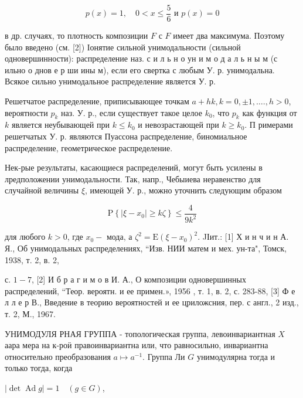 \documentclass[10pt]{article}
\begin{document}
\[

p(x)=1, \quad 0<x \leqslant \frac{5}{6} \text { и } p(x)=0

\]



в др. случаях, то плотность композиции $F$ с $F$ имеет два максимума. Поэтому было введено (см. [2]) Іонятие сильной унимодальности (сильной одновершинности): распределение наз. с и л ь н о ун и м о д а л ь н ы м (с ильно о днов е р ши ины м), если его свертка с любым У. р. унимодальна. Всякое сильно унимодальное распределение является У. р.



Решетчатое распределение, приписывающее точкам $a+h k, k=0, \pm 1, \ldots ., h>0$, вероятности $p_{k}$ наз. У. р., если существует такое целое $k_{0}$, что $p_{k}$ как функция от $k$ является неубывающей при $k \leqslant k_{0}$ и невозрастающей при $k \geqslant k_{0}$. П римерами решетчатых У. р. являются Пуассона распределение, биномиальное распределение, геометрическое распределение.



Нек-рые результаты, касающиеся распределений, могут быть усилены в лредположении унимодальности. Так, напр., Чебыиева неравенство для случайной величины $\xi$, имеющей У. р., можно уточнить следующим образом



\[

\mathrm{P}\left\{\left|\xi-x_{0}\right| \geqslant k \zeta\right\} \leqslant \frac{4}{9 k^{2}}

\]



для любого $k>0$, где $x_{0}-$ мода, а $\zeta^{2}=\mathrm{E}\left(\xi-x_{0}\right)^{2}$. JІит.: [1] Х и н ч и н А. Я., Об унимодальных распределениях, “Изв. НИИ матем и мех. ун-та", Томск, 1938, т. 2, в. 2,

с. $1-7$, [2] И б р а г и м о в И. А., О композиции одновершинных распределений, “Теор. вероятн. и ее примен.», 1956 , т. 1, в. 2, с. 283-88, [3] Ф е л л е р В., Введение в теорию вероятностей и ее цриложсния, пер. с англ., 2 изд., т. 2, М., 1967.



УНИМОДУЛЯ РНАЯ ГРУППА - топологическая группа, левоинвариантная $X$ аара мера на к-роӥ правоинвариантна или, что равносильно, инвариантна относительно преобразования $a \longmapsto a^{-1}$. Группа Ли $G$ унимодулярна тогда и только тогда, когда



$|\operatorname{det} \operatorname{Ad} g|=1 \quad(g \in G)$,
\end{document}
